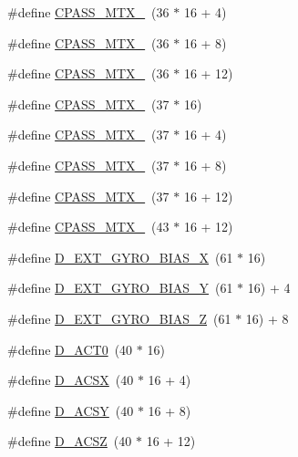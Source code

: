 \begin{DoxyCompactItemize}
\item 
\#define \hyperlink{group___d_r_i_v_e_r_s_gaf0c24262e6d095fbd0b259111221d22f}{C\+P\+A\+S\+S\+\_\+\+M\+T\+X\+\_}~(36 $\ast$ 16 + 4)
\item 
\#define \hyperlink{group___d_r_i_v_e_r_s_gac5f1350e9764b47bad1e5338e1f42e42}{C\+P\+A\+S\+S\+\_\+\+M\+T\+X\+\_}~(36 $\ast$ 16 + 8)
\item 
\#define \hyperlink{group___d_r_i_v_e_r_s_ga345d7d640ac1340e3eaf23c4efc9cd80}{C\+P\+A\+S\+S\+\_\+\+M\+T\+X\+\_}~(36 $\ast$ 16 + 12)
\item 
\#define \hyperlink{group___d_r_i_v_e_r_s_gad6a7e3d40cf198dd69e7d3caeefc8453}{C\+P\+A\+S\+S\+\_\+\+M\+T\+X\+\_}~(37 $\ast$ 16)
\item 
\#define \hyperlink{group___d_r_i_v_e_r_s_ga5f4053bd26eb944d431d93d282be9296}{C\+P\+A\+S\+S\+\_\+\+M\+T\+X\+\_}~(37 $\ast$ 16 + 4)
\item 
\#define \hyperlink{group___d_r_i_v_e_r_s_ga452f20a72e035275b876e8cc592691f6}{C\+P\+A\+S\+S\+\_\+\+M\+T\+X\+\_}~(37 $\ast$ 16 + 8)
\item 
\#define \hyperlink{group___d_r_i_v_e_r_s_gae126c2fef7bf856f38d6d04b7504a3c4}{C\+P\+A\+S\+S\+\_\+\+M\+T\+X\+\_}~(37 $\ast$ 16 + 12)
\item 
\#define \hyperlink{group___d_r_i_v_e_r_s_gab45a80c778b591671aa8f10a64209423}{C\+P\+A\+S\+S\+\_\+\+M\+T\+X\+\_}~(43 $\ast$ 16 + 12)
\item 
\#define \hyperlink{group___d_r_i_v_e_r_s_gae48ad5d76a4abec0759ff23ba2b2a68e}{D\+\_\+\+E\+X\+T\+\_\+\+G\+Y\+R\+O\+\_\+\+B\+I\+A\+S\+\_\+X}~(61 $\ast$ 16)
\item 
\#define \hyperlink{group___d_r_i_v_e_r_s_ga6de6f7302f19c1f63f1a04b51ff14b1a}{D\+\_\+\+E\+X\+T\+\_\+\+G\+Y\+R\+O\+\_\+\+B\+I\+A\+S\+\_\+Y}~(61 $\ast$ 16) + 4
\item 
\#define \hyperlink{group___d_r_i_v_e_r_s_gacd6dead1c0b0458f1ec5d66914a1cf90}{D\+\_\+\+E\+X\+T\+\_\+\+G\+Y\+R\+O\+\_\+\+B\+I\+A\+S\+\_\+Z}~(61 $\ast$ 16) + 8
\item 
\#define \hyperlink{group___d_r_i_v_e_r_s_ga5d68a8e4a168cc789fb481ba9b1ac431}{D\+\_\+\+A\+C\+T0}~(40 $\ast$ 16)
\item 
\#define \hyperlink{group___d_r_i_v_e_r_s_ga3d6aba10b057d1b66f0c5f33334afb07}{D\+\_\+\+A\+C\+SX}~(40 $\ast$ 16 + 4)
\item 
\#define \hyperlink{group___d_r_i_v_e_r_s_ga289d47aab7f881d4e0c1233229462644}{D\+\_\+\+A\+C\+SY}~(40 $\ast$ 16 + 8)
\item 
\#define \hyperlink{group___d_r_i_v_e_r_s_gaae2baed3a317cde49f3ab8af10e73e97}{D\+\_\+\+A\+C\+SZ}~(40 $\ast$ 16 + 12)

\end{DoxyCompactItemize}
